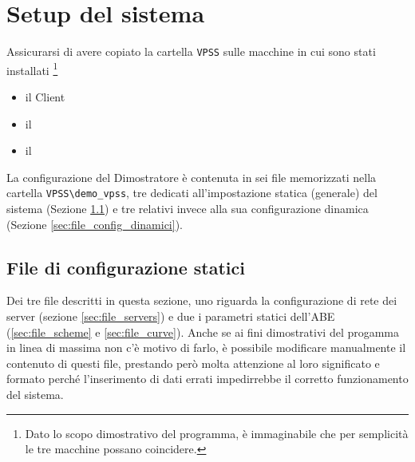 \documentclass[a4paper,twoside,10pt,openany]{scrbook}
\begin{document}
\chapter{Setup del sistema}\label{sec:setup}
%
Assicurarsi di avere copiato la cartella \texttt{VPSS} sulle macchine in cui sono stati installati
\footnote{Dato lo scopo dimostrativo del programma, è immaginabile che per semplicità le tre macchine possano coincidere.}\\
 \begin{itemize}
  \item il Client
  \item il \sr
  \item il \sa
 \end{itemize}
%
La configurazione del Dimostratore è contenuta in sei file memorizzati nella cartella \texttt{VPSS\textbackslash demo\_vpss}, tre dedicati all'impostazione statica (generale) del sistema (Sezione \ref{sec:file_config_statici}) e tre relativi invece alla sua configurazione dinamica (Sezione \ref{sec:file_config_dinamici}).\\
%
\section{File di configurazione statici}\label{sec:file_config_statici}
%
Dei tre file descritti in questa sezione, uno riguarda la configurazione di rete dei server (sezione \ref{sec:file_servers}) e due i parametri statici dell'\ac{ABE} (\ref{sec:file_scheme} e \ref{sec:file_curve}). Anche se ai fini dimostrativi del progamma in linea di massima non c'è motivo di farlo, è possibile modificare manualmente il contenuto di questi file, prestando però molta attenzione al loro significato e formato perché l'inserimento di dati errati impedirrebbe il corretto funzionamento del sistema. 
%
\end{document}
